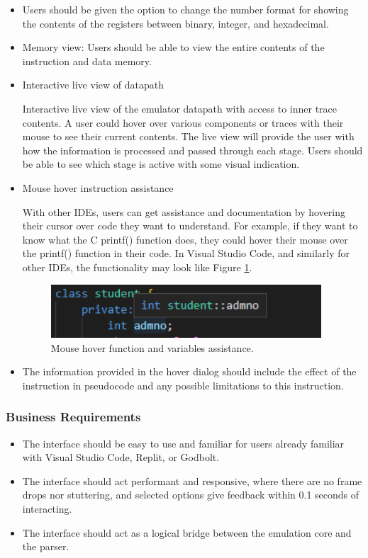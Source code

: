 \documentclass[
    paper=letter,
    parskip=half,
    fontsize=12pt,
    titlepage=firstiscover,
    toc=bibliography,
    numbers=endperiod
]{scrartcl}
\begin{document}
\begin{itemize}
    \item Users should be given the option to change the number format for showing
          the contents of the registers between binary, integer, and hexadecimal.
    \item Memory view: Users should be able to view the entire contents of the
          instruction and data memory.
    \item Interactive live view of datapath

          Interactive live view of the emulator datapath with access to inner
          trace contents. A user could hover over various components or traces
          with their mouse to see their current contents. The live view will
          provide the user with how the information is processed and passed
          through each stage. Users should be able to see which stage is active
          with some visual indication.
    \item Mouse hover instruction assistance

          With other IDEs, users can get assistance and documentation by hovering
          their cursor over code they want to understand. For example, if they
          want to know what the C printf() function does, they could hover their
          mouse over the printf() function in their code. In Visual Studio Code,
          and similarly for other IDEs, the functionality may look like Figure
          \ref{fig:vs-code-hover-variable}.

          \begin{figure}[H]
              \includegraphics[height=2cm]{vs-code-hover-variable}
              \caption{Mouse hover function and variables assistance.}
              \label{fig:vs-code-hover-variable}
          \end{figure}

    \item The information provided in the hover dialog should include the effect
          of the instruction in pseudocode and any possible limitations to this
          instruction.
\end{itemize}

\subsubsection{Business Requirements}
\begin{itemize}
    \item The interface should be easy to use and familiar for users already
          familiar with Visual Studio Code, Replit, or Godbolt.
    \item The interface should act performant and responsive, where there are no
          frame drops nor stuttering, and selected options give feedback within
          0.1 seconds of interacting.
    \item The interface should act as a logical bridge between the emulation core
          and the parser.
\end{itemize}
\end{document}
